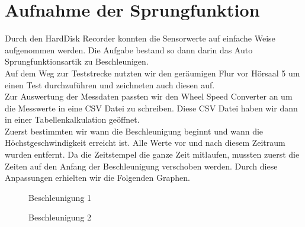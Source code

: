 \documentclass[a4paper,12pt]{report}
\begin{document}
	\section{Aufnahme der Sprungfunktion}
	Durch den HardDisk Recorder konnten die Sensorwerte auf einfache Weise aufgenommen werden. Die Aufgabe bestand so dann darin das Auto Sprungfunktionsartik zu Beschleunigen. \\
	Auf dem Weg zur Teststrecke nutzten wir den geräumigen Flur vor Hörsaal 5 um einen Test durchzuführen und zeichneten auch diesen auf. \\
	Zur Auswertung der Messdaten passten wir den Wheel Speed Converter an um die Messwerte in eine CSV Datei zu schreiben. Diese CSV Datei haben wir dann in einer Tabellenkalkulation geöffnet. \\
	Zuerst bestimmten wir wann die Beschleunigung beginnt und wann die Höchstgeschwindigkeit erreicht ist. Alle Werte vor und nach diesem Zeitraum wurden entfernt. Da die Zeitstempel die ganze Zeit mitlaufen, mussten zuerst die Zeiten auf den Anfang der Beschleunigung verschoben werden. Durch diese Anpassungen erhielten wir die Folgenden Graphen.\\
	\begin{figure}[ht]
		\centering
		
		\caption{Beschleunigung 1}
		\label{img-accelleration1}
	\end{figure}

	\begin{figure}[ht]
		\centering
		
		\caption{Beschleunigung 2}
		\label{img-accelleration2}
	\end{figure}
	
\end{document}
